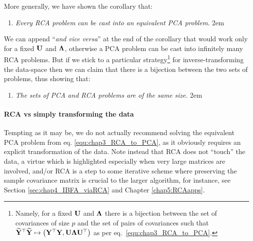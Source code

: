       More generally, we have shown the corollary that:
      \begin{enumerate}
	\item[] \emph{Every RCA problem can be cast into an equivalent PCA problem}.
	\rightskip2em
      \end{enumerate}
      We can append ``\textit{and vice versa}'' at the end of the corollary that would work only for a fixed $\mathbf{U}$ and $\mathbf{\Lambda}$, otherwise a PCA problem can be cast into infinitely many RCA problems.
      But if we stick to a particular strategy\footnote{Namely, for a fixed $\mathbf{U}$ and $\mathbf{\Lambda}$ there is a bijection between the set of covariances of size $p$ and the set of pairs of covariances such that $\widetilde{\mathbf{Y}}^\top\widetilde{\mathbf{Y}} \mapsto \left(\mathbf{Y}^\top\mathbf{Y}, \mathbf{U} \mathbf{\Lambda}  \mathbf{U}^\top\right)$ as per eq.~\eqref{equ:chap3_RCA_to_PCA}.} for inverse-transforming the data-space then we can claim that there is a bijection between the two sets of problems, thus showing that:
      \begin{enumerate}
	\item[] \emph{The sets of PCA and RCA problems are of the same size.}
	\rightskip2em
      \end{enumerate}
      
      \paragraph{RCA vs simply transforming the data}
      Tempting as it may be, we do not actually recommend solving the equivalent PCA problem from
      eq. \eqref{equ:chap3_RCA_to_PCA}, as it obviously requires an explicit transformation of the data.
      Note instead that RCA does not ``touch'' the data, a virtue which is highlighted especially when
      very large matrices are involved,
      and/or RCA is a step to some iterative scheme where preserving the sample covariance matrix
      is crucial to the larger algorithm, for instance, see Section \ref{sec:chap4_IBFA_viaRCA} and Chapter \ref{chap5:RCAapps}.
      
      
